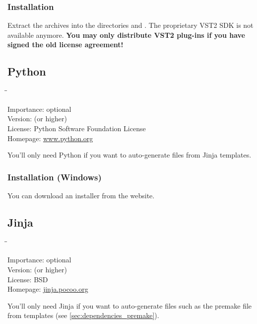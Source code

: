 \subsubsection{Installation}

Extract the archives into the directories  and
.  The proprietary VST2 SDK is not available
anymore.  \textbf{You may only distribute VST2 plug-ins if you have
  signed the old license agreement!}

\subsection{Python}

\begin{tabbing}
  \hspace*{6em}\=\=\kill

  Importance:  \> optional \\
  Version:      (or higher) \\
  License:     \> Python Software Foundation License \\
  Homepage:    \> \href{http://www.python.org/}{www.python.org}
\end{tabbing}

You'll only need Python if you want to auto-generate files from Jinja
templates.

\subsubsection{Installation (Windows)}

You can download an installer from the website.

\subsection{Jinja}

\begin{tabbing}
  \hspace*{6em}\=\=\kill

  Importance:  \> optional \\
  Version:      (or higher) \\
  License:     \> BSD \\
  Homepage:    \> \href{http://jinja.pocoo.org/}{jinja.pocoo.org}
\end{tabbing}

You'll only need Jinja if you want to auto-generate files such as the
premake file from templates (see \ref{sec:dependencies_premake}).

